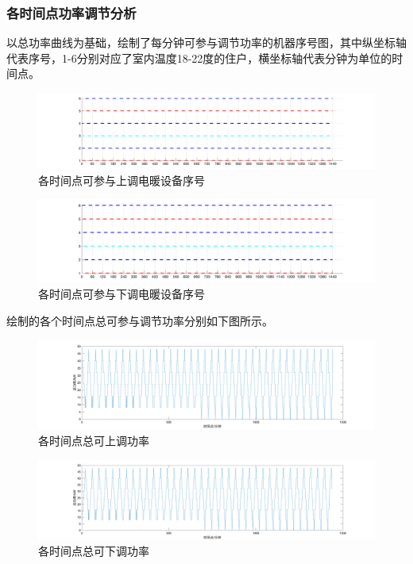 \documentclass[withoutpreface,bwprint]{cumcmthesis} %
\begin{document}
    \subsubsection{各时间点功率调节分析}
    以总功率曲线为基础，绘制了每分钟可参与调节功率的机器序号图，其中纵坐标轴代表序号，1-6分别对应了室内温度18-22度的住户，横坐标轴代表分钟为单位的时间点。
    \begin{figure}[H]
    \centering
        \includegraphics[width=1\textwidth]{figures/3-2-no.png}
    \caption{各时间点可参与上调电暖设备序号}
    \label{fig:my_label}
    \end{figure}
    
    \begin{figure}[H]
    \centering
        \includegraphics[width=1\textwidth]{figures/3-2-down.png}
    \caption{各时间点可参与下调电暖设备序号}
    \label{fig:my_label}
    \end{figure}
    
    绘制的各个时间点总可参与调节功率分别如下图所示。
      \begin{figure}[H]
    \centering
        \includegraphics[width=1\textwidth]{figures/3-2-t-up.png}
    \caption{各时间点总可上调功率}
    \label{fig:my_label}
    \end{figure}
    
    \begin{figure}[H]
    \centering
        \includegraphics[width=1\textwidth]{figures/3-2-t-down.png}
    \caption{各时间点总可下调功率}
    \label{fig:my_label}
    \end{figure}
    
\end{document}
